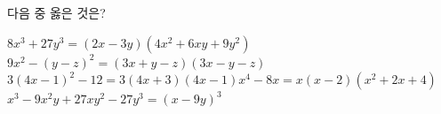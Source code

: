 다음 중 옳은 것은?
\begin{choicesv}{$8x^3+27y^3=(2x-3y)(4x^2+6xy+9y^2)$}{$9x^2-(y-z)^2=(3x+y-z)(3x-y-z)$}{$3(4x-1)^2-12=3(4x+3)(4x-1)$}{$x^4-8x=x(x-2)(x^2+2x+4)$}{$x^3-9x^2y+27xy^2-27y^3=(x-9y)^3$}\end{choicesv}

